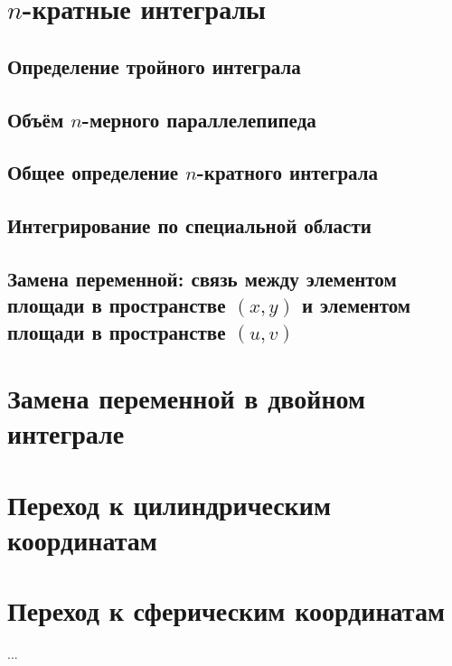 \section{$n$-кратные интегралы}
\subsection{Определение тройного интеграла}
\subsection{Объём $n$-мерного параллелепипеда}
\subsection{Общее определение $n$-кратного интеграла}
\subsection{Интегрирование по специальной области}
\subsection{Замена переменной: связь между элементом площади в пространстве $(x,y)$ и элементом площади в пространстве $(u,v)$}
\section{Замена переменной в двойном интеграле}
\section{Переход к цилиндрическим координатам}
\section{Переход к сферическим координатам}
...

